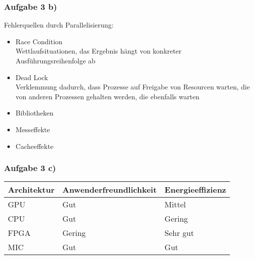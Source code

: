 \documentclass[german,notes,18pt]{beamer}
\begin{document}
	\begin{frame}
		\frametitle{Aufgabe 3 b)}
		
		Fehlerquellen durch Parallelisierung:
		\begin{itemize}
			\item Race Condition \\
			Wettlaufsituationen, das Ergebnis hängt von konkreter Ausführungsreihenfolge ab
			\item Dead Lock \\
			Verklemmung dadurch, dass Prozesse auf Freigabe von Resourcen warten, die von anderen Prozessen gehalten werden, die ebenfalls warten
			\item Bibliotheken
			\item Messeffekte
			\item Cacheeffekte
		\end{itemize}
	\end{frame}
	
	\begin{frame}
		\frametitle{Aufgabe 3 c)}
		
		\begin{table}
			\centering
			\begin{tabular}{l | p{4cm} p{4cm}}
				Architektur & Anwenderfreundlichkeit & Energieeffizienz \\
				\hline
				GPU & Gut & Mittel \\
				CPU & Gut & Gering \\
				FPGA & Gering & Sehr gut \\
				MIC & Gut & Gut
			\end{tabular}
		\end{table}
	\end{frame}
\end{document}

